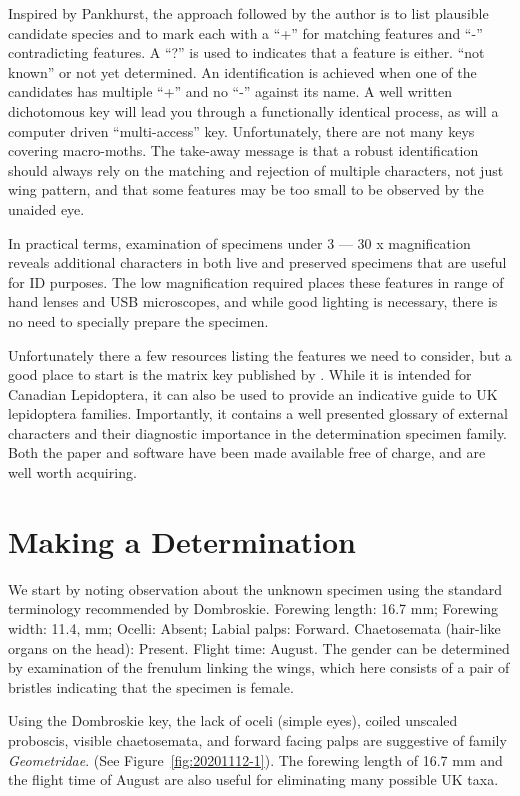 \documentclass[]{article}
\begin{document}
 Inspired by Pankhurst, the approach followed by the author is to list plausible candidate species and to mark each with a \enquote{+} for matching features and \enquote{-} contradicting features. A \enquote{?} is used to  indicates that a feature is either. \enquote{not known} or not yet determined. An identification is achieved when one of the candidates has multiple \enquote{+} and no \enquote{-} against its name.
 A well written dichotomous key will lead you through a functionally identical process, as will a computer driven \enquote{multi-access} key. Unfortunately, there are not many keys covering macro-moths.
 The take-away message is that a robust identification should always rely on the matching and rejection of multiple characters, not just wing pattern, and that some features  may be too small to be observed by the unaided eye.  
 
 In practical terms,  examination of specimens under  3 --- 30 x magnification reveals additional characters  in both live and preserved specimens that are useful for ID purposes. The low magnification required places these features in range of hand lenses and USB microscopes, and while good lighting is necessary, there is no need to specially prepare the specimen.
 
 Unfortunately there a few resources listing the features we need to consider, but a good place to start is the matrix key published by \citet{Dombroskie2011}. While it is intended for Canadian Lepidoptera, it can also be used to provide an indicative guide to UK lepidoptera families. Importantly, it contains a well presented glossary of external characters and their diagnostic importance in the determination specimen family. Both the paper and software have been made available free of charge, and are well worth acquiring.
 
\section*{Making a Determination}
We start by noting observation about the unknown specimen using the standard terminology recommended by Dombroskie.
Forewing length: 16.7 mm; Forewing width: 11.4, mm;  Ocelli: Absent;  Labial palps: Forward. Chaetosemata (hair-like organs on the head):  Present. Flight time: August. The gender can be determined by examination of the frenulum linking the wings, which here consists of a pair of bristles indicating that the specimen is female.

Using the Dombroskie key, the lack of oceli (simple eyes), coiled unscaled proboscis, visible chaetosemata, and forward facing palps are suggestive of family \textit{Geometridae}. (See Figure~\ref{fig:20201112-1}). The forewing length of 16.7 mm and the flight time of August are also useful for eliminating many possible UK taxa.
\end{document}
